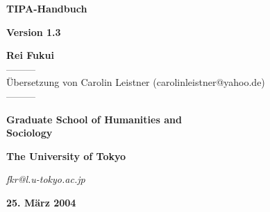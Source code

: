 %
%
%
\thispagestyle{empty}


\begin{center}
\renewcommand\sfdefault{cmss}
{\Huge \textsf{\textbf{TIPA-Handbuch}}}
\par\vspace{1cm}
{\huge \textsf{\textbf{Version 1.3}}}
\par\vspace{3cm}
{\huge \textsf{\textbf{Rei Fukui}\\---------\\\"Ubersetzung von Carolin Leistner (carolinleistner@yahoo.de)\\---------}}
\par\vspace{1cm}
{\LARGE \textsf{\textbf{Graduate School of Humanities and\\[4mm] Sociology}}}
\par\vspace{.5cm}
{\LARGE \textsf{\textbf{The University of Tokyo}}}
\par\vspace{1cm}
{\Large \textit{fkr@l.u-tokyo.ac.jp}}
\par\vspace{1cm}
{\LARGE \textsf{\textbf{25. M\"arz 2004}}}
\end{center}


\newpage
\thispagestyle{empty}


\Sweet
\IPAshape


